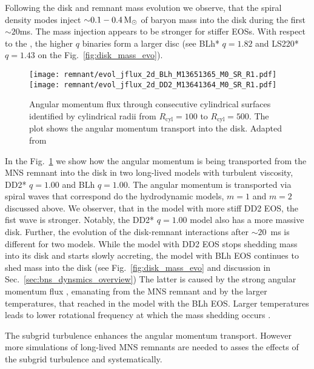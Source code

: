Following the disk and remnant mass evolution we observe, that the spiral 
density modes inject ${\sim}0.1-0.4\,{\text{M}_{\odot}}$ of baryon mass into the disk during the 
first ${\sim}20$ms. 
The mass injection appears to be stronger for stiffer \acp{EOS}. 
With respect to the \mr{}, the higher $q$ binaries form a larger disc 
(see BLh* $q=1.82$ and LS220* $q=1.43$ on the Fig.~\ref{fig:disk_mass_evo}).

\begin{figure}[t]
    \centering 
    \texttt{[image: remnant/evol\_jflux\_2d\_BLh\_M13651365\_M0\_SR\_R1.pdf]}
    \texttt{[image: remnant/evol\_jflux\_2d\_DD2\_M13641364\_M0\_SR\_R1.pdf]}
    \caption{Angular momentum flux through consecutive cylindrical
        surfaces identified by cylindrical radii from $R_{\text{cyl}}=100$ to $R_{\text{cyl}}=500$. The
        plot shows the angular momentum transport into the disk.
        Adapted from \citet{Nedora:2020pak}
    }
    \label{fig:disk_ang_mom_flux_map_blh_q1}
\end{figure}

In the Fig.~\ref{fig:disk_ang_mom_flux_map_blh_q1} we show how the 
angular momentum is being transported from the \ac{MNS} remnant into the disk
in two long-lived models with turbulent viscosity, DD2* $q=1.00$ and BLh $q=1.00$.
The angular momentum is transported via spiral waves that correspond do the 
hydrodynamic models, $m=1$ and $m=2$ discussed above.
We observer, that in the model with more stiff DD2 \ac{EOS},
the fist wave is stronger. Notably, the DD2* $q=1.00$ model 
also has a more massive disk.
Further, the evolution of the disk-remnant interactions 
after $\sim20$~ms \pmerg{} is different for two models. 
While the model with DD2 \ac{EOS} stops shedding mass into 
its disk and starts slowly accreting, the model with BLh \ac{EOS} continues to shed mass into the disk
(see Fig.~\ref{fig:disk_mass_evo} and discussion in
Sec.~\ref{sec:bns_dynsmics_overview})
The latter is caused by the strong angular momentum flux , emanating 
from the \ac{MNS} remnant and by the larger temperatures, 
that reached in the model with the BLh \ac{EOS}.
Larger temperatures leads to lower rotational frequency 
at which the mass shedding occurs \citep{Kaplan:2013wra}. 

The subgrid turbulence enhances the angular momentum transport. However more simulations of long-lived 
\ac{MNS} remnants are needed to asses the effects of the 
subgrid turbulence and \mr{} systematically. 

